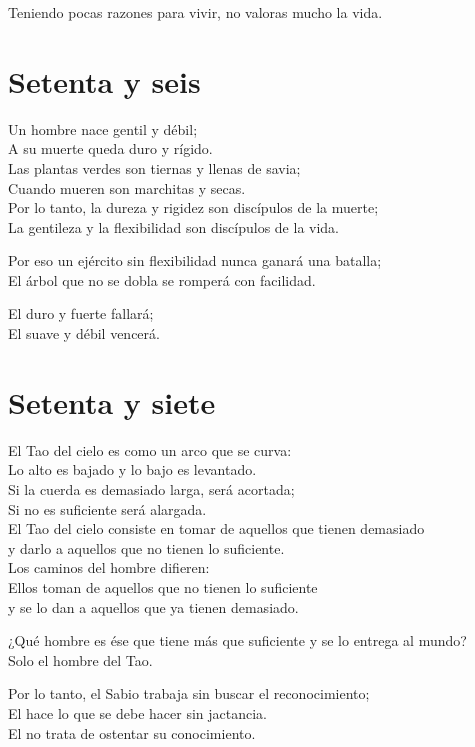 \documentclass[book,b5paper,hidelinks,final]{memoir}
\begin{document}
	Teniendo pocas razones para vivir, no valoras mucho la vida.
	
	\chapter*{Setenta y seis}
	
	Un hombre nace gentil y débil;\\
	A su muerte queda duro y rígido.\\
	Las plantas verdes son tiernas y llenas de savia;\\
	Cuando mueren son marchitas y secas.\\
	Por lo tanto, la dureza y rigidez son discípulos de la muerte;\\
	La gentileza y la flexibilidad son discípulos de la vida.
	
	Por eso un ejército sin flexibilidad nunca ganará una batalla;\\
	El árbol que no se dobla se romperá con facilidad.
	
	El duro y fuerte fallará;\\
	El suave y débil vencerá.
	
	\chapter*{Setenta y siete}
	
	El Tao del cielo es como un arco que se curva:\\
	Lo alto es bajado y lo bajo es levantado.\\
	Si la cuerda es demasiado larga, será acortada;\\
	Si no es suficiente será alargada.\\
	El Tao del cielo consiste en tomar de aquellos que tienen demasiado\\
	y darlo a aquellos que no tienen lo suficiente.\\
	Los caminos del hombre difieren:\\
	Ellos toman de aquellos que no tienen lo suficiente\\
	y se lo dan a aquellos que ya tienen demasiado.
	
	¿Qué hombre es ése que tiene más que suficiente y se lo entrega al
	mundo?\\
	Solo el hombre del Tao.
	
	Por lo tanto, el Sabio trabaja sin buscar el reconocimiento;\\
	El hace lo que se debe hacer sin jactancia.\\
	El no trata de ostentar su conocimiento.
	
\end{document}
